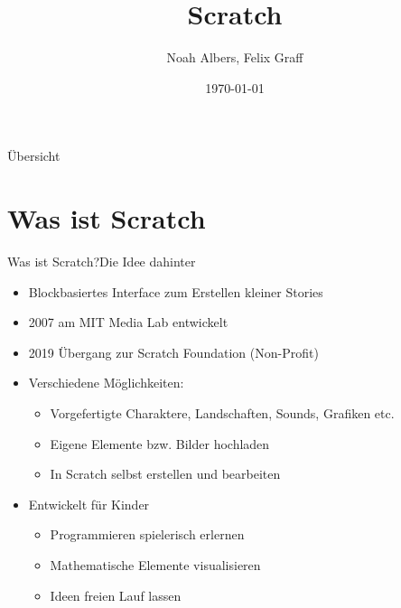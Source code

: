 \documentclass{beamer}
\title{Scratch}
\author{Noah Albers, Felix Graff}
\institute{Uni Münster}
\date{\today}
\newcommand{\ppause}{}
\begin{document}
	
	\frame{\titlepage}
	
	\begin{frame}{Übersicht}
		\tableofcontents
	\end{frame}
	
	\section{Was ist Scratch}	
	\begin{frame}{Was ist Scratch?}{Die Idee dahinter}
		\begin{itemize}
			\ppause
			\item Blockbasiertes Interface zum Erstellen kleiner Stories
			\ppause
			\item 2007 am MIT Media Lab entwickelt
			\ppause
			\item 2019 Übergang zur Scratch Foundation (Non-Profit)
			\ppause
			\item Verschiedene Möglichkeiten:
			\begin{itemize}
				\ppause
				\item Vorgefertigte Charaktere, Landschaften, Sounds, Grafiken etc.
				\ppause
				\item Eigene Elemente bzw. Bilder hochladen
				\ppause
				\item In Scratch selbst erstellen und bearbeiten
			\end{itemize}
			\ppause
			\item Entwickelt für Kinder
			\begin{itemize}
				\ppause
				\item Programmieren spielerisch erlernen
				\ppause
				\item Mathematische Elemente visualisieren
				\ppause
				\item Ideen freien Lauf lassen
			\end{itemize}
		\end{itemize}
	\end{frame}
	
\end{document}

